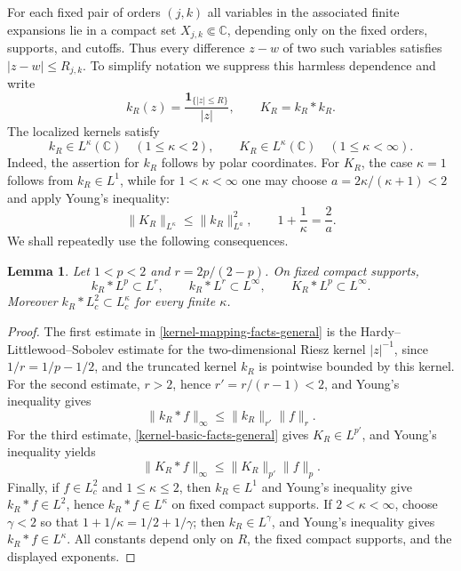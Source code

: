 \documentclass[a4paper,11pt]{article}
\newcommand{\C}{\mathbb{C}}
\theoremstyle{plain}
\newtheorem{lem}[thm]{Lemma}
\theoremstyle{definition}
\theoremstyle{remark}
\begin{document}
For each fixed pair of
orders $(j,k)$ all variables in the associated finite expansions lie in a compact
set $X_{j,k}\Subset\C$, depending only on the fixed orders, supports, and cutoffs.  Thus every difference $z-w$ of two such variables
satisfies $|z-w|\le R_{j,k}$.  To simplify notation we suppress this harmless
dependence and write
\begin{equation}\label{localized-kernels-def}
        k_R(z)=\frac{\mathbf 1_{\{|z|\le R\}}}{|z|},
        \qquad
        K_R=k_R*k_R .
\end{equation}
The localized kernels satisfy
\begin{equation}\label{kernel-basic-facts-general}
        k_R\in L^\kappa(\C)\quad(1\le \kappa<2),
        \qquad
        K_R\in L^\kappa(\C)\quad(1\le \kappa<\infty).
\end{equation}
Indeed, the assertion for $k_R$ follows by polar coordinates.  For $K_R$, the case $\kappa=1$ follows from $k_R\in L^1$, while for $1<\kappa<\infty$ one may choose $a=2\kappa/(\kappa+1)<2$ and apply Young's inequality:
\begin{equation}\label{KR-Ls-young}
        \|K_R\|_{L^\kappa}
        \leq \|k_R\|_{L^a}^2,
        \qquad
        1+\frac1\kappa=\frac2a.
\end{equation}
We shall repeatedly use the following consequences.

\begin{lem}\label{lem-localized-kernel-mapping}
Let $1<p<2$ and $r=2p/(2-p)$.  On fixed compact supports,
\begin{equation}\label{kernel-mapping-facts-general}
        k_R*L^p\subset L^r,
        \qquad
        k_R*L^r\subset L^\infty,
        \qquad
        K_R*L^p\subset L^\infty .
\end{equation}
Moreover $k_R*L^2_c\subset L^\kappa_c$ for every finite $\kappa$.
\end{lem}

\begin{proof}
The first estimate in \eqref{kernel-mapping-facts-general} is the
Hardy--Littlewood--Sobolev estimate for the two-dimensional Riesz kernel
$|z|^{-1}$, since $1/r=1/p-1/2$, and the truncated kernel $k_R$ is pointwise
bounded by this kernel.  For the second estimate, $r>2$, hence
$r'=r/(r-1)<2$, and Young's inequality gives
\[
        \|k_R*f\|_\infty\le \|k_R\|_{r'}\|f\|_r .
\]
For the third estimate, \eqref{kernel-basic-facts-general} gives
$K_R\in L^{p'}$, and Young's inequality yields
\[
        \|K_R*f\|_\infty\le \|K_R\|_{p'}\|f\|_p .
\]
Finally, if $f\in L^2_c$ and $1\le \kappa\le2$, then $k_R\in L^1$ and Young's
inequality give $k_R*f\in L^2$, hence $k_R*f\in L^\kappa$ on fixed compact supports.
If $2<\kappa<\infty$, choose $\gamma<2$ so that $1+1/\kappa=1/2+1/\gamma$; then
$k_R\in L^\gamma$, and Young's inequality gives $k_R*f\in L^\kappa$.  All constants
depend only on $R$, the fixed compact supports, and the displayed exponents.
\end{proof}
\end{document}

